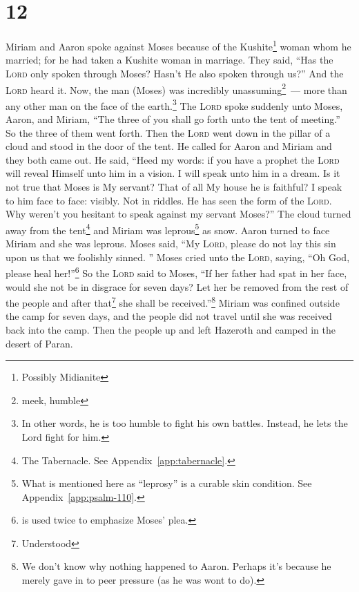 \section{12}
\begin{enumerate}[align=center]
     Miriam and Aaron spoke against Moses because of the Kushite\footnote{Possibly Midianite} woman whom he married; for he had taken a Kushite woman in marriage.%
     They said, ``Has the \textsc{Lord} only spoken through Moses? Hasn't He also spoken through us?'' And the \textsc{Lord} heard it.%
     Now, the man (Moses) was incredibly unassuming\footnote{meek, humble}~--- more than any other man on the face of the earth.\footnote{In other words, he is too humble to fight his own battles. Instead, he lets the Lord fight for him.}%
     The \textsc{Lord} spoke suddenly unto Moses, Aaron, and Miriam, ``The three of you shall go forth unto the tent of meeting.'' So the three of them went forth.%
     Then the \textsc{Lord} went down in the pillar of a cloud and stood in the door of the tent. He called for Aaron and Miriam and they both came out.%
     He said, ``Heed my words: if you have a prophet the \textsc{Lord} will reveal Himself unto him in a vision. I will speak unto him in a dream.%
     Is it not true that Moses is My servant? That of all My house he is faithful?%
     I speak to him face to face: visibly. Not in riddles. He has seen the form of the \textsc{Lord}. Why weren't you hesitant to speak against my servant Moses?''%
     The cloud turned away from the tent\footnote{The Tabernacle. See Appendix~\ref{app:tabernacle}.} and Miriam was leprous\footnote{What is mentioned here as ``leprosy'' is a curable skin condition. See Appendix~\ref{app:psalm-110}.} as snow. Aaron turned to face Miriam and she was leprous.
     Moses said, ``My \textsc{Lord}, please do not lay this sin upon us that we foolishly sinned.%
     ''%
     Moses cried unto the \textsc{Lord}, saying, ``Oh God, please heal her!''\footnote{ is used twice to emphasize Moses' plea.}%
     So the \textsc{Lord} said to Moses, ``If her father had spat in her face, would she not be in disgrace for seven days? Let her be removed from the rest of the people and after that\footnote{Understood} she shall be received.''\footnote{We don't know why nothing happened to Aaron. Perhaps it's because he merely gave in to peer pressure (as he was wont to do).}%
     Miriam was confined outside the camp for seven days, and the people did not travel until she was received back into the camp.%
     Then the people up and left Hazeroth and camped in the desert of Paran.%
\end{enumerate}
